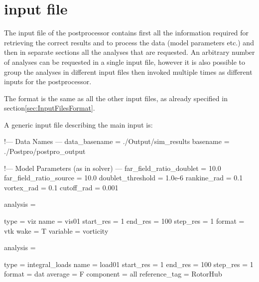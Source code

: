 \section{input file}
\label{sec:Post_InputFile}

The input file of the postprocessor contains first all the information 
required for retrieving the correct results and to process the data 
(model parameters etc.) and then in separate sections all the analyses 
that are requested. An arbitrary number of analyses can be requested in 
a single input file, however it is also possible to group the analyses 
in different input files then invoked multiple times as different inputs 
for the postprocessor. 

The format is the same as all the other input files, as already specified 
in section\ref{sec:InputFilesFormat}.

A generic input file describing the main input is:

\begin{inputfile}[frame=single, caption={dust\_post.in}, label={file:dust_post.in}]
!--- Data Names ---
data_basename = ./Output/sim_results
basename =     ./Postpro/postpro_output

!--- Model Parameters (as in solver) ---
far_field_ratio_doublet = 10.0
far_field_ratio_source = 10.0
doublet_threshold = 1.0e-6
rankine_rad = 0.1
vortex_rad = 0.1
cutoff_rad = 0.001

analysis = {

type = viz  
name = vis01
start_res = 1
end_res   = 100 
step_res  = 1
format = vtk
wake = T
variable = vorticity 
}

analysis = {

type = integral_loads
name = load01
start_res = 1
end_res   = 100 
step_res  = 1
format = dat
average = F
component = all
reference_tag = RotorHub
}

\end{inputfile}

